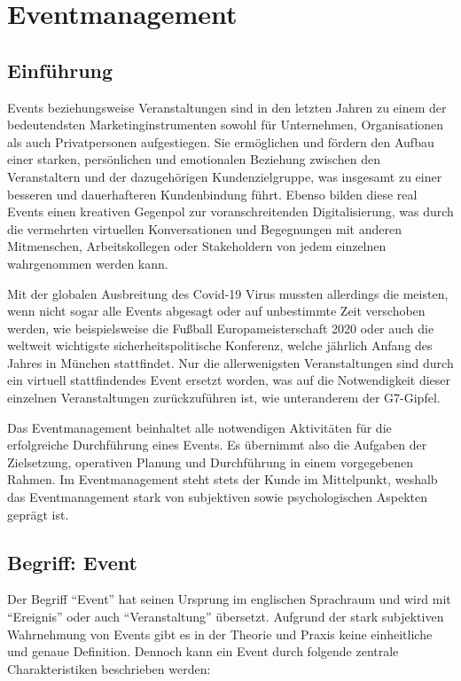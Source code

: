 \chapter{Eventmanagement}
\section{Einführung}
Events beziehungsweise Veranstaltungen sind in den letzten Jahren zu einem der bedeutendsten Marketinginstrumenten sowohl für Unternehmen, Organisationen als auch Privatpersonen aufgestiegen. Sie ermöglichen und fördern den Aufbau einer starken, persönlichen und emotionalen Beziehung zwischen den Veranstaltern und der dazugehörigen Kundenzielgruppe, was insgesamt zu einer besseren und dauerhafteren Kundenbindung führt. Ebenso bilden diese real Events einen kreativen Gegenpol zur voranschreitenden Digitalisierung, was durch die vermehrten virtuellen Konversationen und Begegnungen mit anderen Mitmenschen, Arbeitskollegen oder Stakeholdern von jedem einzelnen wahrgenommen werden kann.\autocite[Vgl.][]{Eventmanagementstudieren.de.o.J.}

Mit der globalen Ausbreitung des Covid-19 Virus mussten allerdings die meisten, wenn nicht sogar alle Events abgesagt oder auf unbestimmte Zeit verschoben werden, wie beispielsweise die Fußball Europameisterschaft 2020 oder auch die weltweit wichtigste sicherheitspolitische Konferenz, welche jährlich Anfang des Jahres in München stattfindet. 
Nur die allerwenigsten Veranstaltungen sind durch ein virtuell stattfindendes Event ersetzt worden, was auf die Notwendigkeit dieser einzelnen Veranstaltungen zurückzuführen ist, wie unteranderem der G7-Gipfel.\autocites[Vgl.][]{Tagesschau.o.J.}[Vgl.][]{Nahar.o.J.}

Das Eventmanagement beinhaltet alle notwendigen Aktivitäten für die erfolgreiche Durchführung eines Events. Es übernimmt also die Aufgaben der Zielsetzung, operativen Planung und Durchführung in einem vorgegebenen Rahmen. Im Eventmanagement steht stets der Kunde im Mittelpunkt, weshalb das Eventmanagement stark von subjektiven sowie psychologischen Aspekten geprägt ist.\autocite[Vgl.][]{ZeitOnline.o.J.}

\section{Begriff: Event}
Der Begriff \enquote{Event} hat seinen Ursprung im englischen Sprachraum und wird mit \enquote{Ereignis} oder auch \enquote{Veranstaltung} übersetzt. Aufgrund der stark subjektiven Wahrnehmung von Events gibt es in der Theorie und Praxis keine einheitliche und genaue Definition. Dennoch kann ein Event durch folgende zentrale Charakteristiken beschrieben werden: 

